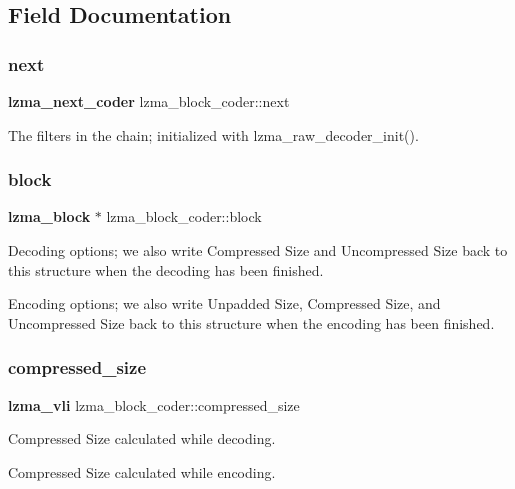 \subsection{Field Documentation}
\mbox{\label{structlzma__block__coder_a339694baef116dbcd2d9955d79889f15}} 
\subsubsection{next}
{\footnotesize\ttfamily \textbf{ lzma\+\_\+next\+\_\+coder} lzma\+\_\+block\+\_\+coder\+::next}



The filters in the chain; initialized with lzma\+\_\+raw\+\_\+decoder\+\_\+init(). 

\mbox{\label{structlzma__block__coder_aa609e1d995965a3b951971963a7e48fd}} 
\subsubsection{block}
{\footnotesize\ttfamily \textbf{ lzma\+\_\+block} $\ast$ lzma\+\_\+block\+\_\+coder\+::block}

Decoding options; we also write Compressed Size and Uncompressed Size back to this structure when the decoding has been finished.

Encoding options; we also write Unpadded Size, Compressed Size, and Uncompressed Size back to this structure when the encoding has been finished. \mbox{\label{structlzma__block__coder_afc40c2393b45f23e21adb8cb7848e421}} 
\subsubsection{compressed\+\_\+size}
{\footnotesize\ttfamily \textbf{ lzma\+\_\+vli} lzma\+\_\+block\+\_\+coder\+::compressed\+\_\+size}



Compressed Size calculated while decoding. 

Compressed Size calculated while encoding. \mbox{\label{structlzma__block__coder_af5921bd99942b38b57ab54519e01ccb9}} 
